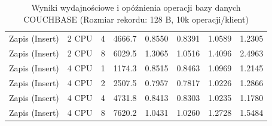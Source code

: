 \begin{table}[ht]
{\begin{tabular}{llcrrrrr}
Zapis (Insert) & 2 CPU & 4 & 4666.7 & 0.8550 & 0.8391 & 1.0589 & 1.2305 \\
Zapis (Insert) & 2 CPU & 8 & 6029.5 & 1.3065 & 1.0516 & 1.4096 & 2.4963 \\
Zapis (Insert) & 4 CPU & 1 & 1174.3 & 0.8515 & 0.8463 & 1.0969 & 1.2145 \\
Zapis (Insert) & 4 CPU & 2 & 2507.5 & 0.7957 & 0.7817 & 1.0226 & 1.2866 \\
Zapis (Insert) & 4 CPU & 4 & 4731.8 & 0.8413 & 0.8303 & 1.0235 & 1.1780 \\
Zapis (Insert) & 4 CPU & 8 & 7620.2 & 1.0431 & 1.0260 & 1.2728 & 1.5484 \\
\bottomrule
\end{tabular}%
}
\caption{Wyniki wydajnościowe i opóźnienia operacji bazy danych COUCHBASE (Rozmiar rekordu: 128 B, 10k operacji/klient)}
\label{tab:latency_couchbase_small_10000}
\end{table}
